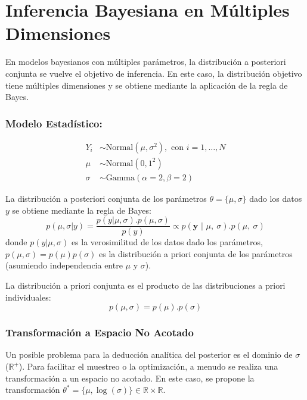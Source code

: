 \documentclass[
]{article}
\begin{document}
\newpage

\section{Inferencia Bayesiana en Múltiples Dimensiones}\label{Objetivo-2}

En modelos bayesianos con múltiples parámetros, la distribución a posteriori conjunta se vuelve el objetivo de inferencia. En este caso, la distribución objetivo tiene múltiples dimensiones y se obtiene mediante la aplicación de la regla de Bayes.

\subsubsection{Modelo Estadístico:}\label{modelo-estaduxedstico}

\vspace{-1.6cm}
\begin{center}
\begin{align*}
Y_i &\sim \text{Normal}(\mu, \sigma^2), \text{ con } i = 1, \dots, N \\
\mu &\sim \text{Normal}(0, 1^2) \\
\sigma &\sim \text{Gamma}(\alpha = 2, \beta = 2)
\end{align*}
\end{center}

La distribución a posteriori conjunta de los parámetros \(\theta = \{\mu, \sigma\}\) dado los datos \(y\) se obtiene mediante la regla de Bayes:
\[p(\mu, \sigma | y) = \frac{p(y | \mu, \sigma). p(\mu, \sigma)}{p(y)} \propto p( \boldsymbol{y}  \text{ | } \mu, \ \sigma).p(\mu, \ \sigma)\]
donde \(p(y | \mu, \sigma)\) es la verosimilitud de los datos dado los parámetros, \(p(\mu, \sigma) = p(\mu) p(\sigma)\) es la distribución a priori conjunta de los parámetros (asumiendo independencia entre \(\mu\) y \(\sigma\)).

La distribución a priori conjunta es el producto de las distribuciones a priori individuales:
\[p(\mu, \sigma) = p(\mu) . p(\sigma)\]

\subsubsection{Transformación a Espacio No Acotado}\label{transformaciuxf3n-a-espacio-no-acotado}

Un posible problema para la deducción analítica del posterior es el dominio de \(\sigma\) (\(\mathbb{R}^+\)). Para facilitar el muestreo o la optimización, a menudo se realiza una transformación a un espacio no acotado. En este caso, se propone la transformación \(\theta^* = \{\mu, \log(\sigma)\} \in \mathbb{R} \times \mathbb{R}\).
\end{document}
